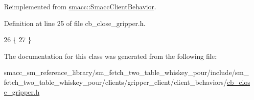 Reimplemented from \hyperlink{classsmacc_1_1SmaccClientBehavior_a7e4fb6ce81ff96dc172425852d69c0c5}{smacc\+::\+Smacc\+Client\+Behavior}.



Definition at line 25 of file cb\+\_\+close\+\_\+gripper.\+h.


\begin{DoxyCode}
26     \{
27     \}
\end{DoxyCode}


The documentation for this class was generated from the following file\+:\begin{DoxyCompactItemize}
\item 
smacc\+\_\+sm\+\_\+reference\+\_\+library/sm\+\_\+fetch\+\_\+two\+\_\+table\+\_\+whiskey\+\_\+pour/include/sm\+\_\+fetch\+\_\+two\+\_\+table\+\_\+whiskey\+\_\+pour/clients/gripper\+\_\+client/client\+\_\+behaviors/\hyperlink{sm__fetch__two__table__whiskey__pour_2include_2sm__fetch__two__table__whiskey__pour_2clients_2graad522381b639c48bac27c49691b676b}{cb\+\_\+close\+\_\+gripper.\+h}\end{DoxyCompactItemize}

